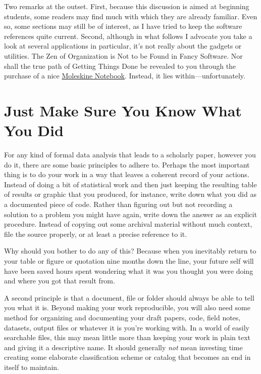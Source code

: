 \documentclass[11pt,article,oneside]{memoir}
\begin{document}
Two remarks at the outset. First, because this discussion is aimed at
beginning students, some readers may find much with which they are
already familiar. Even so, some sections may still be of interest, as
I have tried to keep the software references quite current. Second,
although in what follows I advocate you take a look at several
applications in particular, it's not really about the gadgets or
utilities. The Zen of Organization is Not to be Found in Fancy
Software. Nor shall the true path of Getting Things Done be revealed
to you through the purchase of a nice
\href{http://www.moleskineus.com/}{Moleskine Notebook}. Instead, it
lies within---unfortunately.

\section*{Just Make Sure You Know What You Did}
\label{sec-2}
For any kind of formal data analysis that leads to a scholarly paper,
however you do it, there are some basic principles to adhere
to. Perhaps the most important thing is to do your work in a way that
leaves a coherent record of your actions. Instead of doing a bit of
statistical work and then just keeping the resulting table of results
or graphic that you produced, for instance, write down what you did as
a documented piece of code. Rather than figuring out but not recording
a solution to a problem you might have again, write down the answer as
an explicit procedure. Instead of copying out some archival material
without much context, file the source properly, or at least a precise
reference to it.

Why should you bother to do any of this? Because when you inevitably
return to your table or figure or quotation nine months down the line,
your future self will have been saved hours spent wondering what it
was you thought you were doing and where you got that result from.

A second principle is that a document, file or folder should always be
able to tell you what it is. Beyond making your work reproducible, you
will also need some method for organizing and documenting your draft
papers, code, field notes, datasets, output files or whatever it is
you're working with. In a world of easily searchable files, this may
mean little more than keeping your work in plain text and giving it a
descriptive name. It should generally \emph{not} mean investing time
creating some elaborate classification scheme or catalog that becomes
an end in itself to maintain.
\end{document}
